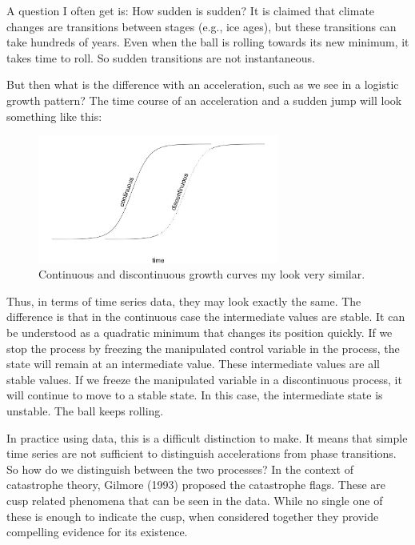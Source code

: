 \documentclass[
  letterpaper,
]{scrbook}
\begin{document}
A question I often get is: How sudden is sudden? It is claimed that
climate changes are transitions between stages (e.g., ice ages), but
these transitions can take hundreds of years. Even when the ball is
rolling towards its new minimum, it takes time to roll. So sudden
transitions are not instantaneous.

But then what is the difference with an acceleration, such as we see in
a logistic growth pattern? The time course of an acceleration and a
sudden jump will look something like this:

\begin{figure}

{\centering \includegraphics[width=3.126in,height=1.66108in]{media/ch3/image18.jpg}

}

\caption{\label{fig-ch3-img18-old-30}Continuous and discontinuous growth
curves my look very similar.}

\end{figure}

Thus, in terms of time series data, they may look exactly the same. The
difference is that in the continuous case the intermediate values are
stable. It can be understood as a quadratic minimum that changes its
position quickly. If we stop the process by freezing the manipulated
control variable in the process, the state will remain at an
intermediate value. These intermediate values are all stable values. If
we freeze the manipulated variable in a discontinuous process, it will
continue to move to a stable state. In this case, the intermediate state
is unstable. The ball keeps rolling.

In practice using data, this is a difficult distinction to make. It
means that simple time series are not sufficient to distinguish
accelerations from phase transitions. So how do we distinguish between
the two processes? In the context of catastrophe theory, Gilmore (1993)
proposed the catastrophe flags. These are cusp related phenomena that
can be seen in the data. While no single one of these is enough to
indicate the cusp, when considered together they provide compelling
evidence for its existence.
\end{document}
